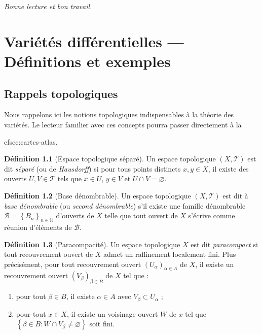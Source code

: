 \documentclass[12pt,a4paper,openany]{book}
\theoremstyle{definition}
\newtheorem{definition}{Définition}[chapter]
\theoremstyle{plain}
\theoremstyle{remark}
\newcommand{\N}{\mathbb{N}}
\newcommand{\set}[1]{\left\{#1\right\}}
\begin{document}
\medskip

\noindent\textit{Bonne lecture et bon travail.}


%
%
\chapter{Variétés différentielles --- Définitions et exemples}
\label{chap:varietes}
\minitoc

\section{Rappels topologiques}
\label{sec:rappels-topo}

Nous rappelons ici les notions topologiques indispensables à la théorie des
variétés. Le lecteur familier avec ces concepts pourra passer directement à la

ef{sec:cartes-atlas}.

\begin{definition}[Espace topologique séparé]\label{def:separe}
Un espace topologique $(X, \mathcal{T})$ est dit \emph{séparé} (ou de
\emph{Hausdorff}) si pour tous points distincts $x, y \in X$, il existe des
ouverts $U, V \in \mathcal{T}$ tels que $x \in U$, $y \in V$ et $U \cap V =
\varnothing$.
\end{definition}

\begin{definition}[Base dénombrable]\label{def:base-denombrable}
Un espace topologique $(X, \mathcal{T})$ est dit à \emph{base dénombrable}
(ou \emph{second dénombrable}) s'il existe une famille dénombrable
$\mathcal{B} = \set{B_n}_{n \in \N}$ d'ouverts de $X$ telle que tout ouvert
de $X$ s'écrive comme réunion d'éléments de $\mathcal{B}$.
\end{definition}

\begin{definition}[Paracompacité]\label{def:paracompact}
Un espace topologique $X$ est dit \emph{paracompact} si tout recouvrement
ouvert de $X$ admet un raffinement localement fini. Plus précisément, pour
tout recouvrement ouvert $(U_\alpha)_{\alpha \in A}$ de $X$, il existe un
recouvrement ouvert $(V_\beta)_{\beta \in B}$ de $X$ tel que :
\begin{enumerate}[label=(\roman*)]
    \item pour tout $\beta \in B$, il existe $\alpha \in A$ avec $V_\beta
    \subset U_\alpha$ ;
    \item pour tout $x \in X$, il existe un voisinage ouvert $W$ de $x$ tel que
    $\set{\beta \in B : W \cap V_\beta \neq \varnothing}$ soit fini.
\end{enumerate}
\end{definition}
\end{document}
